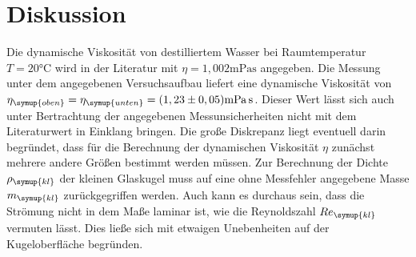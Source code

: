 \section{Diskussion}
\label{sec:Diskussion}
Die dynamische Viskosität von destilliertem Wasser bei Raumtemperatur $T=20\unit{\celsius}$ wird in der
Literatur mit $\eta = 1,002\unit{\milli\pascal\second}$ \cite{dichte} angegeben. Die Messung unter dem 
angegebenen Versuchsaufbau liefert eine dynamische Viskosität von 
$\eta_{\symup{oben}} = \eta_{\symup{unten}} = (1,23\pm0,05)\unit{\milli\pascal\second}$. Dieser Wert lässt sich auch unter 
Bertrachtung der angegebenen Messunsicherheiten nicht mit dem Literaturwert in Einklang bringen. Die große Diskrepanz liegt
eventuell darin begründet, dass für die Berechnung der dynamischen Viskosität $\eta$ zunächst mehrere andere Größen 
bestimmt werden müssen. Zur Berechnung der Dichte $\rho_{\symup{kl}}$ der kleinen Glaskugel muss auf eine ohne Messfehler 
angegebene Masse $m_{\symup{kl}}$ zurückgegriffen werden. Auch kann es durchaus sein, dass die Strömung nicht in dem Maße
laminar ist, wie die Reynoldszahl $Re_{\symup{kl}}$ vermuten lässt. Dies ließe sich mit etwaigen Unebenheiten auf der Kugeloberfläche
begründen. 

